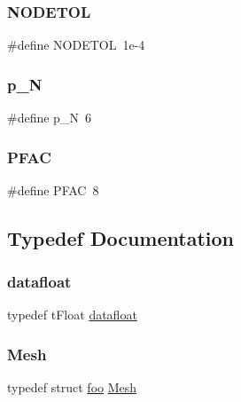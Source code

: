 \subsubsection{\texorpdfstring{N\+O\+D\+E\+T\+OL}{NODETOL}}
{\footnotesize\ttfamily \#define N\+O\+D\+E\+T\+OL~1e-\/4}

\mbox{\label{a00557_a62cad182019fe2be0f29c294c3412fc4}} 
\subsubsection{\texorpdfstring{p\+\_\+N}{p\_N}}
{\footnotesize\ttfamily \#define p\+\_\+N~6}

\mbox{\label{a00557_aa34ba2a0bd4648f24a911d6789081134}} 
\subsubsection{\texorpdfstring{P\+F\+AC}{PFAC}}
{\footnotesize\ttfamily \#define P\+F\+AC~8}



\subsection{Typedef Documentation}
\mbox{\label{a00557_aa484d27c864c1a224505d8a302c0a4a4}} 
\subsubsection{\texorpdfstring{datafloat}{datafloat}}
{\footnotesize\ttfamily typedef t\+Float \hyperlink{a00557_aa484d27c864c1a224505d8a302c0a4a4}{datafloat}}

\mbox{\label{a00557_aeffbe0891ab73a4d8964c9cb7978426e}} 
\subsubsection{\texorpdfstring{Mesh}{Mesh}}
{\footnotesize\ttfamily typedef struct \hyperlink{a00758}{foo} \hyperlink{a00557_aeffbe0891ab73a4d8964c9cb7978426e}{Mesh}}

